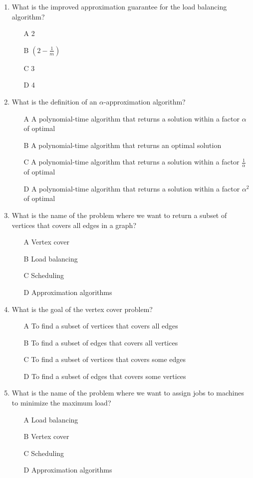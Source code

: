 \documentclass[11pt]{article}
\begin{document}
\begin{enumerate}
\item What is the improved approximation guarantee for the load balancing algorithm?
\begin{enumerate}
\item[A] 2
\item[B] $(2 - \frac{1}{m})$
\item[C] 3
\item[D] 4
\end{enumerate}

\item What is the definition of an $\alpha$-approximation algorithm?
\begin{enumerate}
\item[A] A polynomial-time algorithm that returns a solution within a factor $\alpha$ of optimal
\item[B] A polynomial-time algorithm that returns an optimal solution
\item[C] A polynomial-time algorithm that returns a solution within a factor $\frac{1}{\alpha}$ of optimal
\item[D] A polynomial-time algorithm that returns a solution within a factor $\alpha^2$ of optimal
\end{enumerate}

\item What is the name of the problem where we want to return a subset of vertices that covers all edges in a graph?
\begin{enumerate}
\item[A] Vertex cover
\item[B] Load balancing
\item[C] Scheduling
\item[D] Approximation algorithms
\end{enumerate}

\item What is the goal of the vertex cover problem?
\begin{enumerate}
\item[A] To find a subset of vertices that covers all edges
\item[B] To find a subset of edges that covers all vertices
\item[C] To find a subset of vertices that covers some edges
\item[D] To find a subset of edges that covers some vertices
\end{enumerate}

\item What is the name of the problem where we want to assign jobs to machines to minimize the maximum load?
\begin{enumerate}
\item[A] Load balancing
\item[B] Vertex cover
\item[C] Scheduling
\item[D] Approximation algorithms
\end{enumerate}

\end{enumerate}
\end{document}
